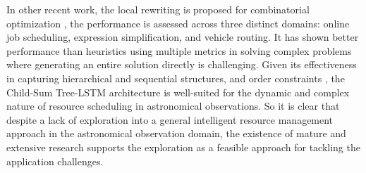 In other recent work, the local rewriting is proposed for combinatorial optimization \cite{chen2019learning}, the performance is assessed across three distinct domains: online job scheduling, expression simplification, and vehicle routing. It has shown better performance than heuristics using multiple metrics in solving complex problems where generating an entire solution directly is challenging. Given its effectiveness in capturing hierarchical and sequential structures, and order constraints \cite{yu2020reinforcement}, the Child-Sum Tree-LSTM architecture is well-suited for the dynamic and complex nature of resource scheduling in astronomical observations. So it is clear that despite a lack of exploration into a general intelligent resource management approach in the astronomical observation domain, the existence of mature and extensive research supports the exploration as a feasible approach for tackling the application challenges.